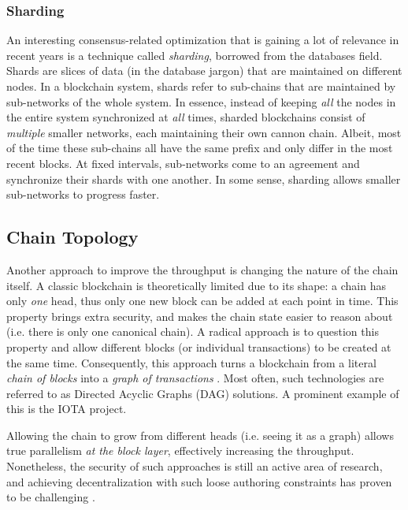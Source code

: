 \subsubsection{Sharding}
An interesting consensus-related optimization that is gaining a lot of relevance in recent years is
a technique called \textit{sharding}, borrowed from the databases field. Shards are slices of data
(in the database jargon) that are maintained on different nodes. In a blockchain system, shards
refer to sub-chains that are maintained by sub-networks of the whole system. In essence, instead of
keeping \textit{all} the nodes in the entire system synchronized at \textit{all} times, sharded
blockchains consist of \textit{multiple} smaller networks, each maintaining their own cannon chain.
Albeit, most of the time these sub-chains all have the same prefix and only differ in the most
recent blocks. At fixed intervals, sub-networks come to an agreement and synchronize their shards
with one another. In some sense, sharding allows smaller sub-networks to progress
faster\cite{forestierBlockcliqueScalingBlockchains2019, al-bassamChainspaceShardedSmart2017,
shreyDiPETransFrameworkDistributed2019}.

\subsection{Chain Topology}

Another approach to improve the throughput is changing the nature of the chain itself. A classic
blockchain is theoretically limited due to its shape: a chain has only \textit{one} head, thus only
one new block can be added at each point in time. This property brings extra security, and makes the
chain state easier to reason about (i.e. there is only one canonical chain). A radical approach is
to question this property and allow different blocks (or individual transactions) to be created at
the same time. Consequently, this approach turns a blockchain from a literal \textit{chain of
blocks} into a \textit{graph of transactions} \cite{pervezComparativeAnalysisDAGBased2018}. Most
often, such technologies are referred to as Directed Acyclic Graphs (DAG) solutions. A prominent
example of this is the IOTA project\cite{mIOTANextGenerationBlock2018}.

Allowing the chain to grow from different heads (i.e. seeing it as a graph) allows true parallelism
\textit{at the block layer}, effectively increasing the throughput. Nonetheless, the security of
such approaches is still an active area of research, and achieving decentralization with such loose
authoring constraints has proven to be challenging \cite{sompolinskySPECTREFastScalable2016}.

